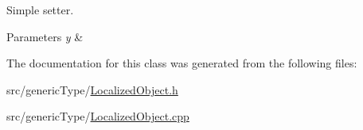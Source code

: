 Simple setter. 


\begin{DoxyParams}{Parameters}
{\em y} & \\
\hline
\end{DoxyParams}


The documentation for this class was generated from the following files\+:\begin{DoxyCompactItemize}
\item 
src/generic\+Type/\hyperlink{LocalizedObject_8h}{Localized\+Object.\+h}\item 
src/generic\+Type/\hyperlink{LocalizedObject_8cpp}{Localized\+Object.\+cpp}\end{DoxyCompactItemize}
